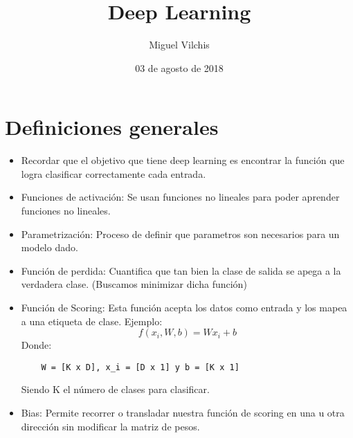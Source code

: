 \documentclass{article}
\begin{document}
\title{\vspace{-1cm}Deep Learning}
\author{Miguel Vilchis}
\date{03 de agosto de 2018}
\maketitle
\section{Definiciones generales}
  \begin{itemize}
    \item Recordar que el objetivo que tiene deep learning es encontrar 
    la función que logra clasificar correctamente cada entrada.
    \item Funciones de activación: Se usan funciones no lineales para
    poder aprender funciones no lineales.
    \item Parametrización: Proceso de definir que parametros son
    necesarios para un modelo dado.
    \item Función de perdida: Cuantifica que tan bien la clase de
    salida se apega a la verdadera clase. (Buscamos minimizar dicha
    función)
    \item Función de Scoring: Esta función acepta los datos como
    entrada y los mapea a una etiqueta de clase. Ejemplo: 
    \[ f(x_i, W, b) = Wx_i+b
    \] 
    Donde: 
    \begin{lstlisting}
    W = [K x D], x_i = [D x 1] y b = [K x 1]
    \end{lstlisting}
    Siendo K el número de clases para clasificar.
    \item Bias: Permite recorrer o transladar nuestra función de
    scoring en una u otra dirección sin modificar la matriz de pesos.
  \end{itemize}
\end{document}
